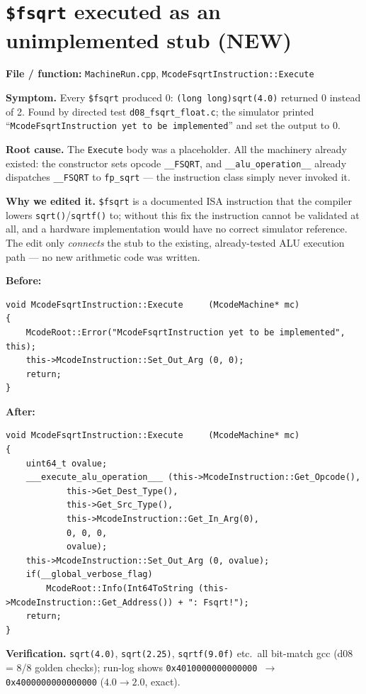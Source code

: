 \documentclass[11pt,a4paper]{report}
\begin{document}
\section{\texttt{\$fsqrt} executed as an unimplemented stub (NEW)}

\textbf{File / function:} \texttt{MachineRun.cpp},
\texttt{McodeFsqrtInstruction::Execute}

\textbf{Symptom.} Every \texttt{\$fsqrt} produced 0:
\texttt{(long long)sqrt(4.0)} returned 0 instead of 2. Found by directed test
\texttt{d08\_fsqrt\_float.c}; the simulator printed
``\texttt{McodeFsqrtInstruction yet to be implemented}'' and set the output
to 0.

\textbf{Root cause.} The \texttt{Execute} body was a placeholder. All the
machinery already existed: the constructor sets opcode \texttt{\_\_FSQRT},
and \texttt{\_\_alu\_operation\_\_} already dispatches \texttt{\_\_FSQRT} to
\texttt{fp\_sqrt} --- the instruction class simply never invoked it.

\textbf{Why we edited it.} \texttt{\$fsqrt} is a documented ISA instruction
that the compiler lowers \texttt{sqrt()}/\texttt{sqrtf()} to; without this
fix the instruction cannot be validated at all, and a hardware implementation
would have no correct simulator reference. The edit only \emph{connects} the
stub to the existing, already-tested ALU execution path --- no new arithmetic
code was written.

\textbf{Before:}
\begin{lstlisting}
void McodeFsqrtInstruction::Execute     (McodeMachine* mc)
{
    McodeRoot::Error("McodeFsqrtInstruction yet to be implemented", this);
    this->McodeInstruction::Set_Out_Arg (0, 0);
    return;
}
\end{lstlisting}

\textbf{After:}
\begin{lstlisting}
void McodeFsqrtInstruction::Execute     (McodeMachine* mc)
{
    uint64_t ovalue;
    ___execute_alu_operation___ (this->McodeInstruction::Get_Opcode(),
            this->Get_Dest_Type(),
            this->Get_Src_Type(),
            this->McodeInstruction::Get_In_Arg(0),
            0, 0, 0,
            ovalue);
    this->McodeInstruction::Set_Out_Arg (0, ovalue);
    if(__global_verbose_flag)
        McodeRoot::Info(Int64ToString (this->McodeInstruction::Get_Address()) + ": Fsqrt!");
    return;
}
\end{lstlisting}

\textbf{Verification.} \texttt{sqrt(4.0)}, \texttt{sqrt(2.25)},
\texttt{sqrtf(9.0f)} etc.\ all bit-match gcc (d08 = 8/8 golden checks);
run-log shows \texttt{0x4010000000000000 $\to$ 0x4000000000000000}
($4.0 \to 2.0$, exact).
\end{document}
